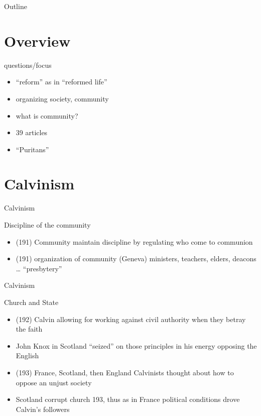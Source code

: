 

\maketitle
\begin{frame}{Outline}
\setcounter{tocdepth}{1}
\tableofcontents
\end{frame}

\begin{center}

\end{center}
\section{Overview}
\label{sec-1}
\begin{frame}[label=sec-1-1]{questions/focus}
\begin{itemize}
\item ``reform'' as in ``reformed life''
\item organizing society, community
\item what is community?
\item 39 articles
\item ``Puritans''
\end{itemize}
\end{frame}

\section{Calvinism}
\label{sec-2}
\begin{frame}[label=sec-2-1]{Calvinism}
\begin{block}{Discipline of the community}
\begin{itemize}
\item (191) Community maintain discipline by regulating who come to communion
\item (191) organization of community (Geneva) ministers, teachers, elders, deacons \ldots{} ``presbytery''
\end{itemize}
\end{block}
\end{frame}

\begin{frame}[label=sec-2-2]{Calvinism}
\begin{block}{Church and State}
\begin{itemize}
\item (192) Calvin allowing for working against civil authority when they betray the faith
\item John Knox in Scotland ``seized'' on those principles in his energy opposing the English
\item (193) France, Scotland, then England Calvinists thought about how to oppose an unjust society
\item Scotland corrupt church 193, thus as in France political conditions drove Calvin's followers
\end{itemize}
\end{block}
\end{frame}

